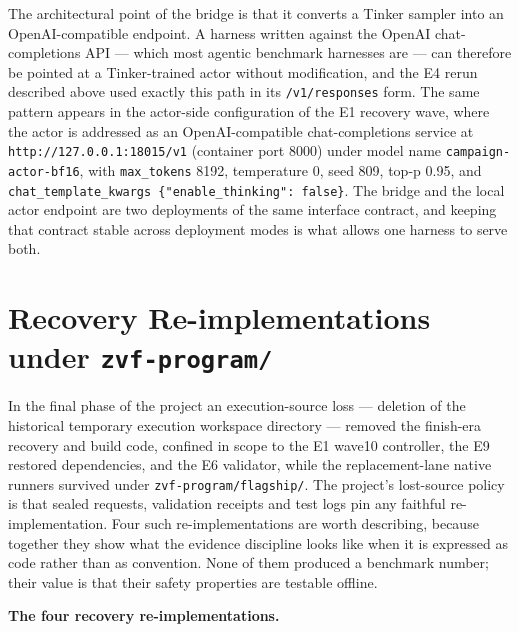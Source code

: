 \documentclass[12pt,a4paper]{report}
\begin{document}
The architectural point of the bridge is that it converts a Tinker
sampler into an OpenAI-compatible endpoint. A harness written against
the OpenAI chat-completions API --- which most agentic benchmark
harnesses are --- can therefore be pointed at a Tinker-trained actor
without modification, and the E4 rerun described above used exactly this
path in its \texttt{/v1/responses} form. The same pattern appears in the
actor-side configuration of the E1 recovery wave, where the actor is
addressed as an OpenAI-compatible chat-completions service at
\texttt{http://127.0.0.1:18015/v1} (container port 8000) under model
name \texttt{campaign-actor-bf16}, with \texttt{max\_tokens} 8192,
temperature 0, seed 809, top-p 0.95, and
\texttt{chat\_\allowbreak{}\allowbreak{}template\_\allowbreak{}\allowbreak{}kwargs\ \{"\allowbreak{}enable\_\allowbreak{}thinking"\allowbreak{}:\allowbreak{}\ false\}}. The
bridge and the local actor endpoint are two deployments of the same
interface contract, and keeping that contract stable across deployment
modes is what allows one harness to serve both.

\section{\texorpdfstring{Recovery Re-implementations under
\texttt{zvf-program/}}{Recovery Re-implementations under zvf-program/}}\label{recovery-re-implementations-under-zvf-program}

In the final phase of the project an execution-source loss --- deletion
of the historical temporary execution workspace directory --- removed
the finish-era recovery and build code, confined in scope to the E1
wave10 controller, the E9 restored dependencies, and the E6 validator,
while the replacement-lane native runners survived under
\texttt{zvf-program/flagship/}. The project's lost-source policy is that
sealed requests, validation receipts and test logs pin any faithful
re-implementation. Four such re-implementations are worth describing,
because together they show what the evidence discipline looks like when
it is expressed as code rather than as convention. None of them produced
a benchmark number; their value is that their safety properties are
testable offline.

\textbf{The four recovery re-implementations.}
\end{document}

